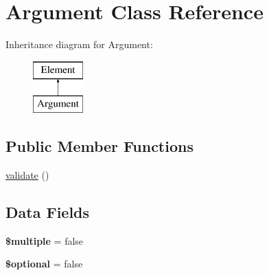 \hypertarget{class_p_e_a_r2_1_1_console_1_1_command_line_1_1_argument}{
\section{\-Argument \-Class \-Reference}
\label{class_p_e_a_r2_1_1_console_1_1_command_line_1_1_argument}
}
\-Inheritance diagram for \-Argument\-:\begin{figure}[H]
\begin{center}
\leavevmode
\includegraphics[height=2.000000cm]{class_p_e_a_r2_1_1_console_1_1_command_line_1_1_argument}
\end{center}
\end{figure}
\subsection*{\-Public \-Member \-Functions}
\begin{DoxyCompactItemize}
\item 
\hyperlink{class_p_e_a_r2_1_1_console_1_1_command_line_1_1_argument_a184909dab34698899937d810a9f5d393}{validate} ()
\end{DoxyCompactItemize}
\subsection*{\-Data \-Fields}
\begin{DoxyCompactItemize}
\item 
\hypertarget{class_p_e_a_r2_1_1_console_1_1_command_line_1_1_argument_a17e227bf0681e8fe65c2604112b28da6}{
{\bfseries \$multiple} = false}
\label{class_p_e_a_r2_1_1_console_1_1_command_line_1_1_argument_a17e227bf0681e8fe65c2604112b28da6}

\item 
\hypertarget{class_p_e_a_r2_1_1_console_1_1_command_line_1_1_argument_a8d50efd090a3dbb81de883567a422a5f}{
{\bfseries \$optional} = false}
\label{class_p_e_a_r2_1_1_console_1_1_command_line_1_1_argument_a8d50efd090a3dbb81de883567a422a5f}

\end{DoxyCompactItemize}


